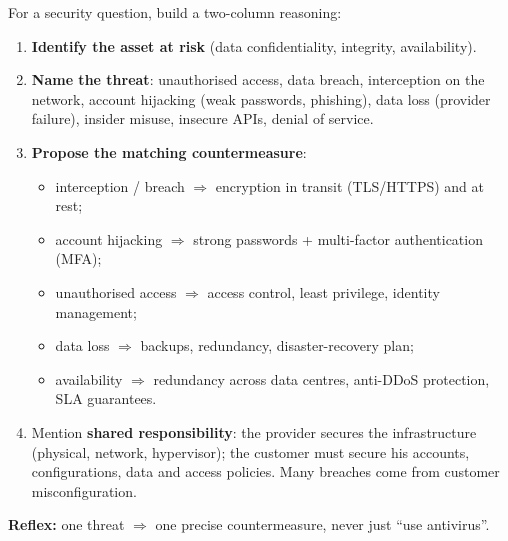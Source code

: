 \documentclass[11pt]{article}
\newcommand{\cle}[1]{{\popxbold\color{popdark}#1}}
\begin{document}
\begin{methode}
For a security question, build a two-column reasoning:
\begin{enumerate}
\item \textbf{Identify the asset at risk} (data confidentiality, integrity, availability).
\item \textbf{Name the threat}: unauthorised access, data breach, interception on the network, account hijacking (weak passwords, phishing), data loss (provider failure), insider misuse, insecure APIs, denial of service.
\item \textbf{Propose the matching countermeasure}:
\begin{itemize}
\item interception / breach $\Rightarrow$ \cle{encryption} in transit (TLS/HTTPS) and at rest;
\item account hijacking $\Rightarrow$ strong passwords + \cle{multi-factor authentication} (MFA);
\item unauthorised access $\Rightarrow$ access control, least privilege, identity management;
\item data loss $\Rightarrow$ \cle{backups}, redundancy, disaster-recovery plan;
\item availability $\Rightarrow$ redundancy across data centres, anti-DDoS protection, SLA guarantees.
\end{itemize}
\item Mention \textbf{shared responsibility}: the provider secures the infrastructure (physical, network, hypervisor); the customer must secure his accounts, configurations, data and access policies. Many breaches come from customer misconfiguration.
\end{enumerate}
\textbf{Reflex:} one threat $\Rightarrow$ one precise countermeasure, never just ``use antivirus''.
\end{methode}
\end{document}
